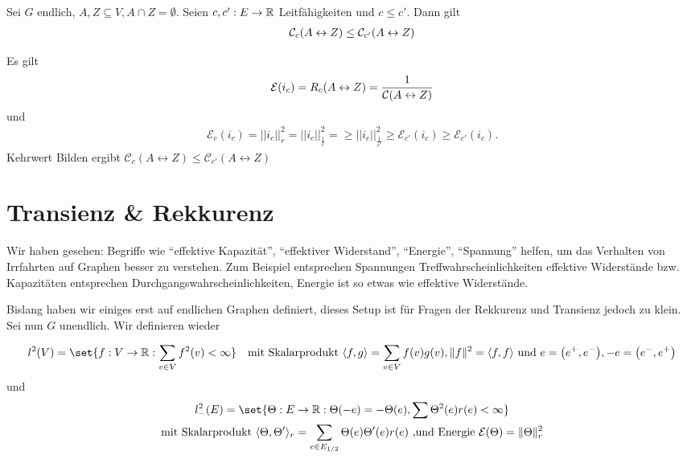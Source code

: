 \begin{satz}
	Sei $G$ endlich, $A,Z \subseteq V, A \cap Z = \emptyset$. Seien $c,c' : E \to \mathbb{R}$ Leitfähigkeiten und $c \leq c'$. Dann gilt
	\begin{align}
		\mathcal{C}_c\enb{A \leftrightarrow Z} \leq \mathcal{C}_{c'} \enb{A \leftrightarrow Z}
	\end{align}
\end{satz}
\begin{beweis}
	Es gilt
	\begin{gather}
		\mathcal{E}(i_c) =  R_c(A \leftrightarrow Z) = \frac{1}{\leit{A \leftrightarrow Z}}
	\end{gather}
	und 
	\begin{gather}
		\mathcal{E}_c(i_c) = ||i_c||^2_r = ||i_c||^2_{\frac{1}{c}} =\geq ||i_c||^2_{\frac{1}{c'}} \geq \mathcal{E}_{c'}(i_c) \geq \mathcal{E}_{c'}(i_{c}).
	\end{gather}
	Kehrwert Bilden ergibt $\mathcal{C}_c(A \leftrightarrow Z) \leq \mathcal{C}_{c'} (A \leftrightarrow Z)$
\end{beweis}

\section{Transienz \& Rekkurenz}

Wir haben gesehen: Begriffe wie \enquote{effektive Kapazität}, \enquote{effektiver Widerstand}, \enquote{Energie}, \enquote{Spannung} helfen, um das Verhalten von Irrfahrten auf Graphen besser zu verstehen. Zum Beispiel entsprechen Spannungen Treffwahrscheinlichkeiten effektive Widerstände bzw. Kapazitäten entsprechen Durchgangswahrscheinlichkeiten, Energie ist so etwas wie effektive Widerstände.

Bislang haben wir einiges erst auf endlichen Graphen definiert, dieses Setup ist für Fragen der Rekkurenz und Transienz jedoch zu klein. Sei nun $G$ unendlich. Wir definieren wieder

\begin{align}
	l^2(V) = \set{f:V \to \Real: \sum\limits_{v\in V} f^2(v)<\infty } && \text{mit Skalarprodukt } \sprod{f,g} = \sum\limits_{v \in V} f(v)g(v),  \Norm{f}^2 = \sprod{f,f} \text{ und } e = \enb{e^+,e^-}, -e = \enb{e^-,e^+}
\end{align}
und
\begin{gather}
	l^2_-(E) = \set{\Theta:E \to \Real: \Theta(-e) = -\Theta(e), \sum \Theta^2(e)r(e) < \infty} \\
	 \text{mit Skalarprodukt } \sprod{\Theta, \Theta'}_r = \sum\limits_{e \in E_{1/2}} \Theta(e)\Theta'(e)r(e) \text{ ,und Energie } \mathcal{E}(\Theta) = \Norm{\Theta}^2_r
\end{gather}

